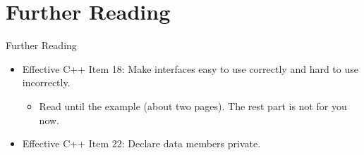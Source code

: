 \documentclass{beamer}
\begin{document}
\section{Further Reading}

\begin{frame}{Further Reading}
    \begin{itemize}
        \item Effective C++ Item 18: Make interfaces easy to use correctly and hard to use incorrectly.
        \begin{itemize}
            \item Read until the  example (about two pages). The rest part is not for you now.
        \end{itemize}
        \item Effective C++ Item 22: Declare data members private.
    \end{itemize}
\end{frame}
\end{document}
